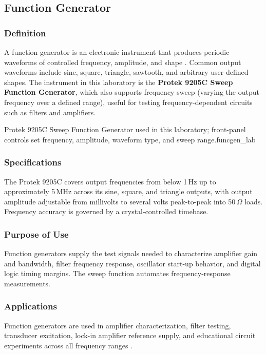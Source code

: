 \subsection{Function Generator}

\subsubsection*{Definition}
A function generator is an electronic instrument that produces periodic waveforms of
controlled frequency, amplitude, and shape \cite{horowitz2015}. Common output waveforms
include sine, square, triangle, sawtooth, and arbitrary user-defined shapes. The
instrument in this laboratory is the \textbf{Protek 9205C Sweep Function Generator},
which also supports frequency sweep (varying the output frequency over a defined range),
useful for testing frequency-dependent circuits such as filters and amplifiers.

%
  {Protek 9205C Sweep Function Generator used in this laboratory;
   front-panel controls set frequency, amplitude, waveform type, and
   sweep range.}{funcgen_lab}

\subsubsection*{Specifications}
The Protek 9205C covers output frequencies from below 1\,Hz up to approximately
5\,MHz across its sine, square, and triangle outputs, with output amplitude adjustable
from millivolts to several volts peak-to-peak into 50\,$\Omega$ loads. Frequency
accuracy is governed by a crystal-controlled timebase.

\subsubsection*{Purpose of Use}
Function generators supply the test signals needed to characterize amplifier gain and
bandwidth, filter frequency response, oscillator start-up behavior, and digital logic
timing margins. The sweep function automates frequency-response measurements.

\subsubsection*{Applications}
Function generators are used in amplifier characterization, filter testing, transducer
excitation, lock-in amplifier reference supply, and educational circuit experiments
across all frequency ranges \cite{horowitz2015}.
